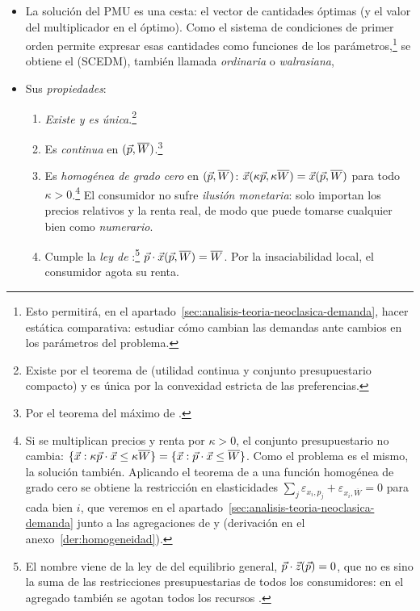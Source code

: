 \documentclass[11pt]{article}
\begin{document}
\begin{itemize}
\item La solución del PMU es una cesta: el vector de cantidades óptimas (y el valor del multiplicador en el óptimo). Como el sistema de condiciones de primer orden permite expresar esas cantidades como funciones de los parámetros,\footnote{Esto permitirá, en el apartado~\ref{sec:analisis-teoria-neoclasica-demanda}, hacer estática comparativa: estudiar cómo cambian las demandas ante cambios en los parámetros del problema.} se obtiene el  (SCEDM), también llamada \emph{ordinaria} o \emph{walrasiana},
\item Sus \emph{propiedades}:
  \begin{enumerate}
  \item \emph{Existe y es única}.\footnote{Existe por el teorema de  (utilidad continua y conjunto presupuestario compacto) y es única por la convexidad estricta de las preferencias.}
  \item Es \emph{continua} en $(\vec{p},\overline{W})$.\footnote{Por el teorema del máximo de .}
  \item Es \emph{homogénea de grado cero} en $(\vec{p},\overline{W})$: $\vec{x}(\kappa\vec{p},\kappa\overline{W})=\vec{x}(\vec{p},\overline{W})$ para todo $\kappa>0$.\footnote{Si se multiplican precios y renta por $\kappa>0$, el conjunto presupuestario no cambia: $\{\vec{x}: \kappa\vec{p}\cdot \vec{x}\leq \kappa\overline{W}\}=\{\vec{x}: \vec{p}\cdot \vec{x}\leq\overline{W}\}$. Como el problema es el mismo, la solución también. Aplicando el teorema de  a una función homogénea de grado cero se obtiene la restricción en elasticidades $\sum_j\varepsilon_{x_i,p_j}+\varepsilon_{x_i,\overline{W}}=0$ para cada bien $i$, que veremos en el apartado~\ref{sec:analisis-teoria-neoclasica-demanda} junto a las agregaciones de  y  (derivación en el anexo~\ref{der:homogeneidad}).} El consumidor no sufre \emph{ilusión monetaria}: solo importan los precios relativos y la renta real, de modo que puede tomarse cualquier bien como \emph{numerario}.
  \item Cumple la \emph{ley de }:\footnote{El nombre viene de la ley de  del equilibrio general, $\vec{p}\cdot\vec{z}(\vec{p})=0$, que no es sino la suma de las restricciones presupuestarias de todos los consumidores: en el agregado también se agotan todos los recursos .} $\vec{p}\cdot \vec{x}(\vec{p},\overline{W})=\overline{W}$. Por la insaciabilidad local, el consumidor agota su renta.

\end{enumerate}
\end{itemize}
\end{document}
